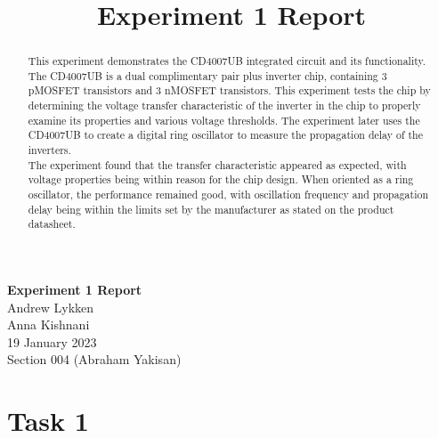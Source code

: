 \documentclass[notitlepage, 12pt]{report}  %
\title{Experiment 1 Report}
\begin{document}


\begin{center}
\large \textbf{Experiment 1 Report} \\ %
\small 
Andrew Lykken\\
Anna Kishnani\\
19 January 2023\\
Section 004 (Abraham Yakisan)\\

\end{center}

\vspace{5in}


\begin{abstract}

This experiment demonstrates the CD4007UB integrated circuit and its functionality. The CD4007UB is a dual complimentary pair 
plus inverter chip, containing 3 pMOSFET transistors and 3 nMOSFET transistors. This experiment tests the chip by determining 
the voltage transfer characteristic of the inverter in the chip to properly examine its properties and various voltage thresholds.
The experiment later uses the CD4007UB to create a digital ring oscillator to measure the propagation delay of the inverters. \\

The experiment found that the transfer characteristic appeared as expected, with voltage properties being within reason for
the chip design. When oriented as a ring oscillator, the performance remained good, with oscillation frequency and 
propagation delay being within the limits set by the manufacturer as stated on the product datasheet.



\end{abstract}

\newpage



\section*{Task 1} %
\end{document}
